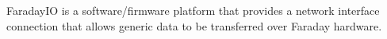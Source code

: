 Faraday\+IO is a software/firmware platform that provides a network interface connection that allows generic data to be transferred over Faraday hardware. 
